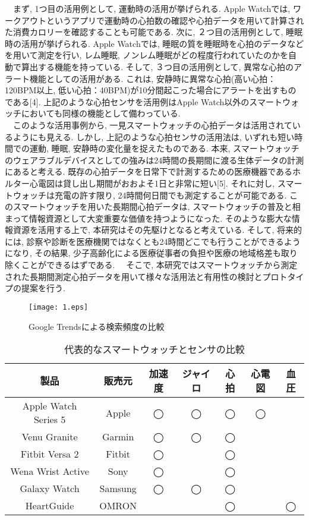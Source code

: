 \documentclass[report, 11pt, a4paper]{jsbook}
\begin{document}
　まず, 1つ目の活用例として, 運動時の活用が挙げられる. Apple Watchでは, ワークアウトというアプリで運動時の心拍数の確認や心拍データを用いて計算された消費カロリーを確認することも可能である. 次に, ２つ目の活用例として, 睡眠時の活用が挙げられる. Apple Watchでは, 睡眠の質を睡眠時を心拍のデータなどを用いて測定を行い, レム睡眠, ノンレム睡眠がどの程度行われていたのかを自動で算出する機能を持っている. そして, ３つ目の活用例として, 異常な心拍のアラート機能としての活用がある. これは, 安静時に異常な心拍(高い心拍：120BPM以上, 低い心拍：40BPM)が10分間起こった場合にアラートを出すものである[4]. 上記のような心拍センサを活用例はApple Watch以外のスマートウォッチにおいても同様の機能として備わっている. \\
　このような活用事例から, 一見スマートウォッチの心拍データは活用されているようにも見える. しかし, 上記のような心拍センサの活用法は, いずれも短い時間での運動, 睡眠, 安静時の変化量を捉えたものである. 本来, スマートウォッチのウェアラブルデバイスとしての強みは24時間の長期間に渡る生体データの計測にあると考える. 既存の心拍データを日常下で計測するための医療機器であるホルター心電図は貸し出し期間がおおよそ1日と非常に短い[5]. それに対し, スマートウォッチは充電の許す限り, 24時間何日間でも測定することが可能である. このスマートウォッチを用いた長期間心拍データは, スマートウォッチの普及と相まって情報資源として大変重要な価値を持つようになった. そのような膨大な情報資源を活用する上で, 本研究はその先駆けとなると考えている. そして, 将来的には, 診察や診断を医療機関ではなくとも24時間どこでも行うことができるようになり, その結果, 少子高齢化による医療従事者の負担や医療の地域格差も取り除くことができるはずである.
　そこで, 本研究ではスマートウォッチから測定された長期間測定心拍データを用いて様々な活用法と有用性の検討とプロトタイプの提案を行う.  

\begin{figure}[H]
\centering
\texttt{[image: 1.eps]}
\caption{Google Trendsによる検索頻度の比較}
\label{fig:goolge_trends}
\end{figure}

\begin{table}[H]
\centering
\caption{代表的なスマートウォッチとセンサの比較}
\begin{tabular}{ccccccc}
\hline
製品                   & 販売元     & 加速度 & ジャイロ & 心拍 & 心電図 & 血圧 \\ \hline
Apple Watch Series 5 & Apple   & ◯   & ◯    & ◯  & ◯   &    \\
Venu Granite         & Garmin  & ◯   & ◯    & ◯  &     &    \\
Fitbit Versa 2       & Fitbit  & ◯   &      & ◯  &     &    \\
Wena Wrist Active    & Sony    & ◯   &      & ◯  &     &    \\
Galaxy Watch         & Samsung & ◯   & ◯    & ◯  &     &    \\
HeartGuide           & OMRON   &     &      & ◯  &     & ◯  \\ \hline
\end{tabular}
\end{table}
　
\end{document}
